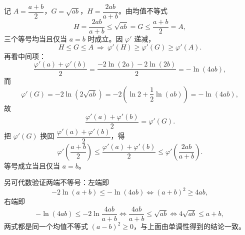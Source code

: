 \begin{answer}
记 $A=\dfrac{a+b}{2}$，$G=\sqrt{ab}$，$H=\dfrac{2ab}{a+b}$。由均值不等式
\nopagebreak[4]
\[H=\frac{2ab}{a+b}\leqslant\sqrt{ab}=G\leqslant\frac{a+b}{2}=A,\]
三个等号均当且仅当 $a=b$ 时成立。因 $\varphi'$ 递减，
\nopagebreak[4]
\[H\leqslant G\leqslant A\ \Longrightarrow\ \varphi'(H)\geqslant\varphi'(G)\geqslant\varphi'(A).\]
再看中间项：
\nopagebreak[4]
\[\frac{\varphi'(a)+\varphi'(b)}{2}=\frac{-2\ln(2a)-2\ln(2b)}{2}=-\ln(4ab),\]
而
\nopagebreak[4]
\[\varphi'(G)=-2\ln\left(2\sqrt{ab}\right)=-2\left(\ln 2+\frac12\ln(ab)\right)=-\ln(4ab),\]
故
\nopagebreak[4]
\[\frac{\varphi'(a)+\varphi'(b)}{2}=\varphi'(G).\]
把 $\varphi'(G)$ 换回 $\dfrac{\varphi'(a)+\varphi'(b)}{2}$，得
\nopagebreak[4]
\[\varphi'\left(\frac{a+b}{2}\right)\leqslant\frac{\varphi'(a)+\varphi'(b)}{2}\leqslant\varphi'\left(\frac{2ab}{a+b}\right).\]
等号成立当且仅当 $a=b$。

另可代数验证两端不等号：左端即
\nopagebreak[4]
\[-2\ln(a+b)\leqslant-\ln(4ab)\iff (a+b)^2\geqslant 4ab,\]
右端即
\nopagebreak[4]
\[-\ln(4ab)\leqslant-2\ln\frac{4ab}{a+b}\iff \frac{4ab}{a+b}\leqslant\sqrt{ab}\iff 4\sqrt{ab}\leqslant a+b,\]
两式都是同一个均值不等式 $(a-b)^2\geqslant 0$，与上面由单调性得到的结论一致。


\end{answer}